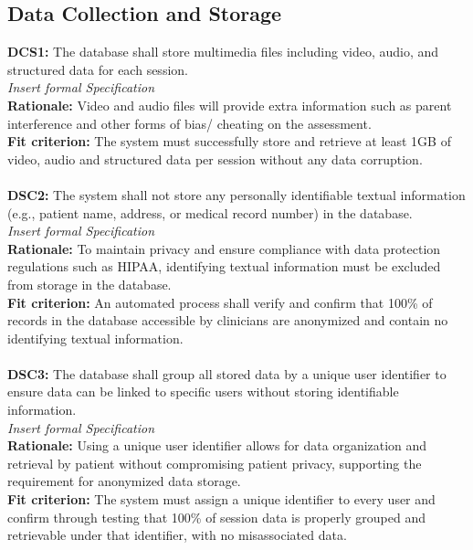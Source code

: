 \documentclass[12pt]{article}
\begin{document}
\subsection{Data Collection and Storage}
\textbf{DCS1: }The database shall store multimedia files including video, audio, and structured data for 
each session.\\
\textit{Insert formal Specification}\\
\textbf{Rationale: }Video and audio files will provide extra information such as parent interference and 
other forms of bias/ cheating on the assessment.\\
\textbf{Fit criterion: }The system must successfully store and retrieve at least 1GB of video, audio and 
structured data per session without any data corruption. \\\\
\textbf{DSC2: }The system shall not store any personally identifiable textual information (e.g., patient name, 
address, or medical record number) in the database.\\
\textit{Insert formal Specification}\\
\textbf{Rationale: }To maintain privacy and ensure compliance with data protection regulations such as HIPAA, 
identifying textual information must be excluded from storage in the database.\\
\textbf{Fit criterion: }An automated process shall verify and confirm that 100\% of records in the database 
accessible by clinicians are anonymized and contain no identifying textual information.\\\\
\textbf{DSC3: }The database shall group all stored data by a unique user identifier to ensure data can be linked 
to specific users without storing identifiable information.\\
\textit{Insert formal Specification}\\
\textbf{Rationale: }Using a unique user identifier allows for data organization and retrieval by patient without 
compromising patient privacy, supporting the requirement for anonymized data storage.\\
\textbf{Fit criterion: }The system must assign a unique identifier to every user and confirm through testing 
that 100\% of session data is properly grouped and retrievable under that identifier, with no misassociated 
data.\\\\
\end{document}
